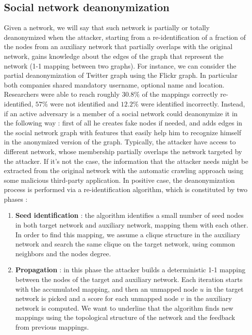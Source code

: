 \subsection{Social network deanonymization}
Given a network, we will say that such network is partially or totally deanonymized when the attacker, starting from a re-identification of a fraction of the nodes from an auxiliary network that partially overlaps with the original network, gains knowledge about the edges of the graph that represent the network (1-1 mapping between two graphs). For instance, we can consider the partial deanonymization of Twitter graph using the Flickr graph. In particular both companies shared mandatory username, optional name and location. Researchers were able to reach roughly $30.8 \%$ of the mappings correctly re-identified, $57 \%$ were not identified and $12.2 \%$ were identified incorrectly. Instead, if an active adversary is a member of a social network could deanonymize it in the following way : first of all he creates fake nodes if needed, and adds edges in the social network graph with features that easily help him to recognize himself in the anonymized version of the graph. Typically, the attacker have access to different network, whose membership partially overlaps the network targeted by the attacker. If it's not the case, the information that the attacker needs might be extracted from the original network with the automatic crawling approach using some malicious third-party application. In positive case, the deanonymization process is performed via a re-identification algorithm, which is constituted by two phases :
\begin{enumerate}
\item \textbf{Seed identification} : the algorithm identifies a small number of seed nodes in both target network and auxiliary network, mapping them with each other. In order to find this mapping, we assume a clique structure in the auxiliary network and search the same clique on the target network, using common neighbors and the nodes degree.
\item \textbf{Propagation} : in this phase the attacker builds a deterministic 1-1 mapping between the nodes of the target and auxiliary network. Each iteration starts with the accumulated mapping, and then an unmapped node $u$ in the target network is picked and a score for each unmapped node $v$ in the auxiliary network is computed. We want to underline that the algorithm finds new mappings using the topological structure of the network and the feedback from previous mappings.
\end{enumerate}

